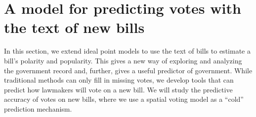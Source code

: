 





\section{A model for predicting votes with the text of new bills}
 
In this section, we extend ideal point models to use the text of bills
to estimate a bill's polarity and popularity.  This gives a new way of
exploring and analyzing the government record and, further, gives a
useful predictor of government.  While traditional methods can only
fill in missing votes, we develop tools that can predict how lawmakers
will vote on a new bill. We will study the predictive accuracy of
votes on new bills, where we use a spatial voting model as a ``cold''
prediction mechanism.

